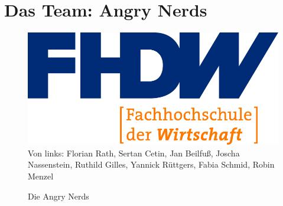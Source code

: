 \section{Das Team: Angry Nerds}
\label{instal}

\begin{figure}[hbt]
\centering
\begin{minipage}[t]{1\textwidth} %
\caption{Die Angry Nerds} %
\includegraphics[width=1\textwidth]{img/fhdw}\\ %
Von links: Florian Rath, Sertan Cetin, Jan Beilfuß, Joscha Nassenstein, Ruthild Gilles, Yannick Rüttgers, Fabia Schmid, Robin Menzel
\end{minipage}
\end{figure}

